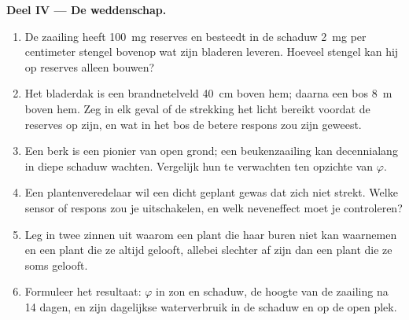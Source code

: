 \begin{problem}
\medskip
\noindent\textbf{Deel IV --- De weddenschap.}
\begin{enumerate}[resume]
  \item De zaailing heeft \qty{100}{mg} reserves en besteedt in de schaduw
        \qty{2}{mg} per centimeter stengel bovenop wat zijn bladeren
        leveren. Hoeveel stengel kan hij op reserves alleen bouwen?
  \item Het bladerdak is een brandnetelveld \qty{40}{cm} boven hem; daarna
        een bos \qty{8}{m} boven hem. Zeg in elk geval of de strekking het
        licht bereikt voordat de reserves op zijn, en wat in het bos de betere
        respons zou zijn geweest.
  \item Een berk is een pionier van open grond; een beukenzaailing kan
        decennialang in diepe schaduw wachten. Vergelijk hun te verwachten
         ten opzichte van $\varphi$.
  \item Een plantenveredelaar wil een dicht geplant gewas dat zich niet
        strekt. Welke sensor of respons zou je uitschakelen, en welk
        neveneffect moet je controleren?
  \item Leg in twee zinnen uit waarom een plant die haar buren niet kan
        waarnemen en een plant die ze altijd gelooft, allebei slechter af
        zijn dan een plant die ze soms gelooft.
  \item Formuleer het resultaat: $\varphi$ in zon en schaduw, de hoogte van
        de zaailing na 14 dagen, en zijn dagelijkse waterverbruik in de
        schaduw en op de open plek.
\end{enumerate}
\end{problem}
